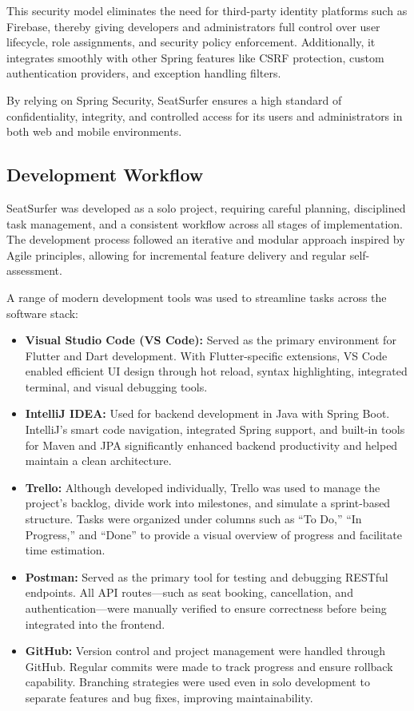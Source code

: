 \documentclass[12pt,a4paper]{report} %
\begin{document}
\noindent
This security model eliminates the need for third-party identity platforms such as Firebase, thereby giving developers and administrators full control over user lifecycle, role assignments, and security policy enforcement. Additionally, it integrates smoothly with other Spring features like CSRF protection, custom authentication providers, and exception handling filters.

By relying on Spring Security, SeatSurfer ensures a high standard of confidentiality, integrity, and controlled access for its users and administrators in both web and mobile environments.

\subsection{Development Workflow}

SeatSurfer was developed as a solo project, requiring careful planning, disciplined task management, and a consistent workflow across all stages of implementation. The development process followed an iterative and modular approach inspired by Agile principles, allowing for incremental feature delivery and regular self-assessment.

A range of modern development tools was used to streamline tasks across the software stack:

\begin{itemize}
    \item \textbf{Visual Studio Code (VS Code):} Served as the primary environment for Flutter and Dart development. With Flutter-specific extensions, VS Code enabled efficient UI design through hot reload, syntax highlighting, integrated terminal, and visual debugging tools.

    \item \textbf{IntelliJ IDEA:} Used for backend development in Java with Spring Boot. IntelliJ's smart code navigation, integrated Spring support, and built-in tools for Maven and JPA significantly enhanced backend productivity and helped maintain a clean architecture.

    \item \textbf{Trello:} Although developed individually, Trello was used to manage the project's backlog, divide work into milestones, and simulate a sprint-based structure. Tasks were organized under columns such as “To Do,” “In Progress,” and “Done” to provide a visual overview of progress and facilitate time estimation.

    \item \textbf{Postman:} Served as the primary tool for testing and debugging RESTful endpoints. All API routes—such as seat booking, cancellation, and authentication—were manually verified to ensure correctness before being integrated into the frontend.

    \item \textbf{GitHub:} Version control and project management were handled through GitHub. Regular commits were made to track progress and ensure rollback capability. Branching strategies were used even in solo development to separate features and bug fixes, improving maintainability.
\end{itemize}
\end{document}
